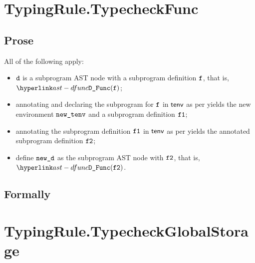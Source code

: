 \section{TypingRule.TypecheckFunc \label{sec:TypingRule.TypecheckFunc}}
\subsection{Prose}
All of the following apply:
\begin{itemize}
  \item $\vd$ is a subprogram AST node with a subprogram definition $\vf$, that is, $\DFunc(\vf)$;
  \item annotating and declaring the subprogram for $\vf$ in $\tenv$ as per 
        yields the new environment $\newtenv$ and a subprogram definition $\vfone$\ProseOrTypeError;
  \item annotating the subprogram definition $\vfone$ in $\tenv$ as per  yields
        the annotated subprogram definition $\vftwo$\ProseOrTypeError;
  \item define $\newd$ as the subprogram AST node with $\vftwo$, that is, $\DFunc(\vftwo)$.
\end{itemize}


\subsection{Formally}
\begin{mathpar}
\end{mathpar}

\section{TypingRule.TypecheckGlobalStorage \label{sec:TypingRule.TypecheckGlobalStorage}}
